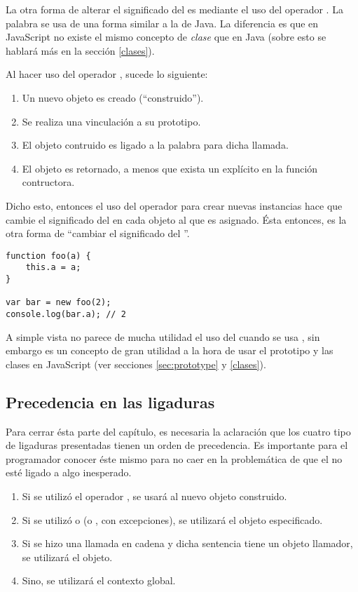 La otra forma de alterar el significado del  es mediante el uso del operador . La palabra  se usa de una forma similar a la de Java. La diferencia es que en JavaScript no existe el mismo concepto de \textit{clase} que en Java (sobre esto se hablará más en la sección \ref{clases}).

Al hacer uso del operador , sucede lo siguiente:

\begin{enumerate}
\item Un nuevo objeto es creado ("`construido"').
\item Se realiza una vinculación a su prototipo.
\item El objeto contruido es ligado a la palabra  para dicha llamada.
\item El objeto es retornado, a menos que exista un  explícito en la función contructora.
\end{enumerate}

Dicho esto, entonces el uso del operador  para crear nuevas instancias hace que cambie el significado del  en cada objeto al que es asignado. Ésta entonces, es la otra forma de "`cambiar el significado del "'.

\begin{lstlisting}[title={Ligadura mediante \code{new}}]
function foo(a) {
	this.a = a;
}

var bar = new foo(2);
console.log(bar.a); // 2
\end{lstlisting}

A simple vista no parece de mucha utilidad el uso del  cuando se usa , sin embargo es un concepto de gran utilidad a la hora de usar el prototipo y las clases en JavaScript (ver secciones \ref{sec:prototype} y \ref{clases}).

\subsection{Precedencia en las ligaduras}

Para cerrar ésta parte del capítulo, es necesaria la aclaración que los cuatro tipo de ligaduras presentadas tienen un orden de precedencia. Es importante para el programador conocer éste mismo para no caer en la problemática de que el  no esté ligado a algo inesperado.

\begin{enumerate}
\item Si se utilizó el operador , se usará al nuevo objeto construido.
\item Si se utilizó  o  (o , con excepciones), se utilizará el objeto especificado.
\item Si se hizo una llamada en cadena y dicha sentencia tiene un objeto llamador, se utilizará el objeto.
\item Sino, se utilizará el contexto global.
\end{enumerate}